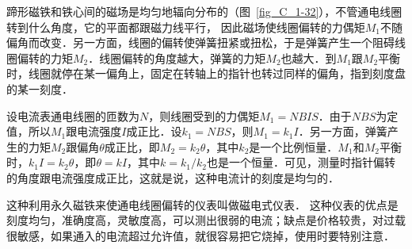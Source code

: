 蹄形磁铁和铁心间的磁场是均匀地辐向分布的（图~\ref{fig_C_1-32}），不管通电线圈转到什么角度，它的平面都跟磁力线平行，
因此磁场使线圈偏转的力偶矩$M_1$不随偏角而改变．另一方面，线圈的偏转使弹簧扭紧或扭松，于是弹簧产生一个阻碍线圈偏转的力矩$M_2$．线圈偏转的角度越大，弹簧的力矩$M_2$也越大．到$M_1$跟$M_2$平衡时，线圈就停在某一偏角上，固定在转轴上的指针也转过同样的偏角，指到刻度盘的某一刻度．

设电流表通电线圈的匝数为$N$，则线圈受到的力偶矩$M_1=NBIS$．由于$NBS$为定值，所以$M_1$跟电流强度$I$成正比．设$k_1=NBS$，则$M_1=k_1I$．另一方面，弹簧产生的力矩$M_2$跟偏角$\theta$成正比，即$M_2=k_2\theta$，其中$k_2$是一个比例恒量．$M_1$和$M_2$平衡时，$k_1I=k_2\theta$，即$\theta =kI$，其中$k=k_1/k_2$也是一个恒量．可见，测量时指针偏转的角度跟电流强度成正比，这就是说，这种电流计的刻度是均匀的．

这种利用永久磁铁来使通电线圈偏转的仪表叫做磁电式仪表．
这种仪表的优点是刻度均匀，准确度高，灵敏度高，可以测出很弱的电流；缺点是价格较贵，对过载很敏感，如果通入的电流超过允许值，就很容易把它烧掉，使用时要特别注意．

